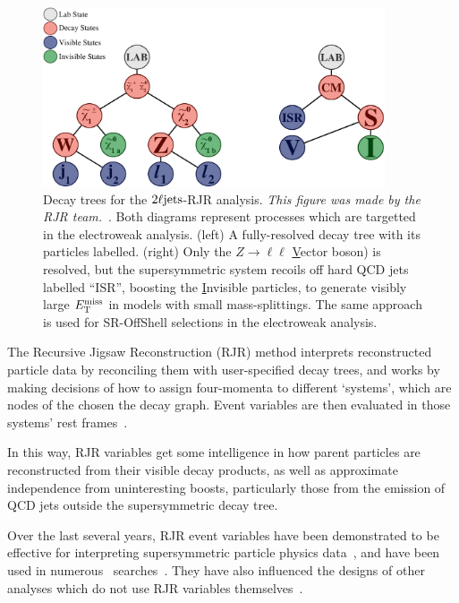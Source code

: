 \begin{figure}[tp]
\centering
\includegraphics[width=0.9\textwidth]{figures/2ljets_rjr_trees.pdf}
\caption[
Decay trees for the $\twoljets$-RJR analysis
]{%
Decay trees for the $\twoljets$-RJR analysis.
\emph{This figure was made by the RJR team.}~\cite{atlas2022searches}.
Both diagrams represent processes which are targetted in the electroweak
analysis.
(left) A fully-resolved decay tree with its particles labelled.
(right) Only the $Z\rightarrow\ell\ell$ \underline{V}ector boson)
is resolved, but the supersymmetric system recoils off
hard QCD jets labelled ``ISR'', boosting the \underline{I}nvisible particles,
to generate visibly large $E_\mathrm{T}^\mathrm{miss}$ in models with small mass-splittings.
The same approach is used for SR-OffShell selections in the electroweak
analysis.
}
\label{fig:2ljets_rjr_decay_trees}
\end{figure}

The Recursive Jigsaw Reconstruction (RJR) method interprets reconstructed
particle data by reconciling them with user-specified decay trees, and works
by making decisions of how to assign four-momenta to different `systems',
which are nodes of the chosen the decay graph.
Event variables are then evaluated in those systems' rest
frames~\cite{jackson2017sparticles, jackson2017rjr}.

In this way, RJR variables get some intelligence in how parent particles are
reconstructed from their visible decay products, as well as approximate
independence from uninteresting boosts, particularly those from the emission of
QCD jets outside the supersymmetric decay tree.

Over the last several years, RJR event variables have been demonstrated to be
effective for interpreting supersymmetric particle physics
data~\cite{santoni2018probing},
and have been used in numerous \atlas\ searches~\cite{%
atlas_rjr_SUSY_2016_07,
atlas_rjr_SUSY_2016_15,
atlas_rjr_SUSY_2016_16,
atlas_rjr_23l_SUSY_2017_03,
atlas_rjr_SUSY_2018_12,
atlas_rjr_EXOT_2019_19,
atlas_rjr_3l_SUSY_2019_09
}.
They have also influenced the designs of other analyses which do not use
RJR variables themselves~\cite{atlas_rjr_mimic_SUSY_2018_06}.

